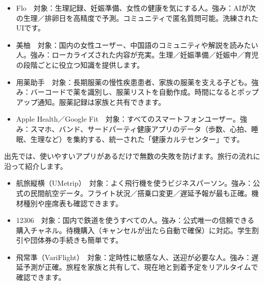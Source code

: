 
\begin{itemize}
  \item Flo　対象：生理記録、妊娠準備、女性の健康を気にする人。強み：AIが次の生理／排卵日を高精度で予測。コミュニティで匿名質問可能。洗練されたUIです。
  \item 美柚　対象：国内の女性ユーザー、中国語のコミュニティや解説を読みたい人。強み：ローカライズされた内容が充実。生理／妊娠準備／妊娠中／育児の段階ごとに役立つ知識を提供します。
\end{itemize}


\begin{itemize}
  \item 用薬助手　対象：長期服薬の慢性疾患患者、家族の服薬を支える子ども。強み：バーコードで薬を識別し、服薬リストを自動作成。時間になるとポップアップ通知。服薬記録は家族と共有できます。
\end{itemize}


\begin{itemize}
  \item Apple Health／Google Fit　対象：すべてのスマートフォンユーザー。強み：スマホ、バンド、サードパーティ健康アプリのデータ（歩数、心拍、睡眠、生理など）を集約する、統一された「健康カルテセンター」です。
\end{itemize}


出先では、使いやすいアプリがあるだけで無数の失敗を防げます。旅行の流れに沿って紹介します。


\begin{itemize}
  \item 航旅縦横（UMetrip）　対象：よく飛行機を使うビジネスパーソン。強み：公式の民間航空データ。フライト状況／搭乗口変更／遅延予報が最も正確。機材種別や座席表も確認できます。
  \item 12306　対象：国内で鉄道を使うすべての人。強み：公式唯一の信頼できる購入チャネル。待機購入（キャンセルが出たら自動で確保）に対応。学生割引や団体券の手続きも簡単です。
  \item 飛常準（VariFlight）　対象：定時性に敏感な人、送迎が必要な人。強み：遅延予測が正確。旅程を家族と共有して、現在地と到着予定をリアルタイムで確認できます。
\end{itemize}

